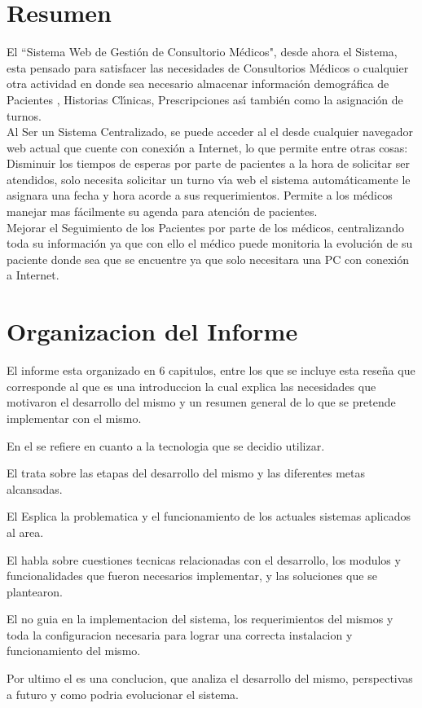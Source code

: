 \section{Resumen}

El ``Sistema Web de Gesti\'on de Consultorio M\'edicos", desde ahora el Sistema, esta pensado
para satisfacer las necesidades de Consultorios M\'edicos o cualquier otra actividad en donde
sea necesario almacenar informaci\'on demogr\'afica de Pacientes , Historias Cl\'{\i}nicas, 
Prescripciones as\'{\i} tambi\'en como la asignaci\'on de turnos.\\[0.1cm] 

Al Ser un Sistema Centralizado, se puede acceder al el desde cualquier navegador web actual 
que cuente con conexi\'on a Internet, lo que permite entre otras cosas:\\[0.1cm]

Disminuir los tiempos de esperas por parte de pacientes a la hora de solicitar ser atendidos, 
solo necesita solicitar un turno v\'{\i}a web el sistema autom\'aticamente le asignara una 
fecha y hora acorde a sus requerimientos. Permite a los m\'edicos manejar mas f\'acilmente su
agenda para atenci\'on de pacientes.\\[0.1cm]

Mejorar el Seguimiento de los Pacientes por parte de los m\'edicos, centralizando toda su 
informaci\'on ya que con ello el m\'edico puede monitoria la evoluci\'on de su paciente donde 
sea que se encuentre ya que solo necesitara una PC con conexi\'on a Internet.\\[0.1cm]


\section{Organizacion del Informe}

El informe esta organizado en 6 capitulos, entre los que se incluye esta reseña
que corresponde al  que es una introduccion la cual explica las necesidades 
que motivaron el desarrollo del mismo y un resumen general de lo que se pretende implementar 
con el mismo. 

En el  se refiere en cuanto a la tecnologia que 
se decidio utilizar. 

El  trata sobre las etapas del desarrollo del mismo y 
las diferentes metas alcansadas.

El  Esplica la problematica y el funcionamiento
de los actuales sistemas aplicados al area. 

El  habla sobre cuestiones
tecnicas relacionadas con el desarrollo, los modulos y funcionalidades que fueron necesarios
implementar, y las soluciones que se plantearon.

El  no guia en la implementacion del sistema, los requerimientos del 
mismos y toda la configuracion necesaria para lograr una correcta instalacion y 
funcionamiento del mismo.

Por ultimo el  es una conclucion, que analiza el desarrollo del mismo, 
perspectivas a futuro y como podria evolucionar el sistema.
